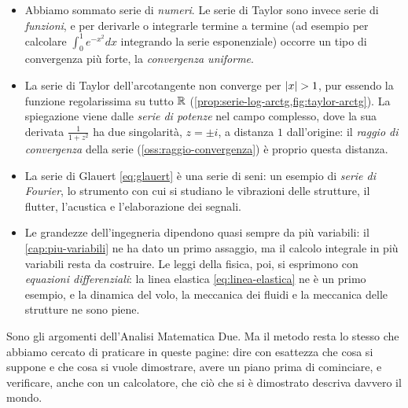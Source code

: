 \begin{itemize}
  \item Abbiamo sommato serie di \emph{numeri}. Le serie di Taylor sono invece serie di
  \emph{funzioni}, e per derivarle o integrarle termine a termine (ad esempio per calcolare
  $\int_{0}^{1}e^{-x^{2}}dx$ integrando la serie esponenziale) occorre un tipo di convergenza più
  forte, la \emph{convergenza uniforme}.
  \item La serie di Taylor dell'arcotangente non converge per $\lvert x\rvert>1$, pur essendo la
  funzione regolarissima su tutto $\mathbb{R}$ (\cref{prop:serie-log-arctg,fig:taylor-arctg}). La
  spiegazione viene dalle \emph{serie di potenze} nel campo complesso, dove la sua derivata
  $\frac1{1+z^{2}}$ ha due singolarità, $z=\pm i$, a distanza $1$ dall'origine: il \emph{raggio di
  convergenza} della serie (\cref{oss:raggio-convergenza}) è proprio questa distanza.
  \item La serie di Glauert \eqref{eq:glauert} è una serie di seni: un esempio di
  \emph{serie di Fourier}, lo strumento con cui si studiano le vibrazioni delle strutture,
  il flutter, l'acustica e l'elaborazione dei segnali.
  \item Le grandezze dell'ingegneria dipendono quasi sempre da più variabili: il
  \cref{cap:piu-variabili} ne ha dato un primo assaggio, ma il calcolo integrale in più
  variabili resta da costruire. Le leggi della fisica, poi, si esprimono con
  \emph{equazioni differenziali}: la linea elastica \eqref{eq:linea-elastica}
  ne è un primo esempio, e la dinamica del volo, la meccanica dei fluidi e la meccanica
  delle strutture ne sono piene.
\end{itemize}

Sono gli argomenti dell'Analisi Matematica Due. Ma il metodo resta lo stesso che abbiamo
cercato di praticare in queste pagine: dire con esattezza che cosa si suppone e che cosa
si vuole dimostrare, avere un piano prima di cominciare, e verificare, anche con un
calcolatore, che ciò che si è dimostrato descriva davvero il mondo.
